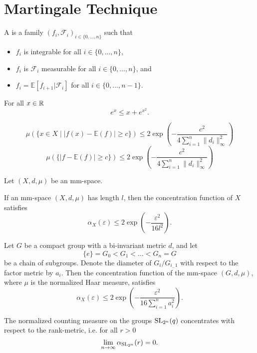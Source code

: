 \section{Martingale Technique}
\begin{definition}
A  is a family $(f_i,\mathcal{F}_i)_{i\in \{0,\dots,n\}}$ such that
\begin{itemize}
\item $f_i$ is integrable for all $i\in \{0,\dots,n\}$,
\item $f_i$ is $\mathcal{F}_i$ measurable for all $i\in \{0,\dots,n\}$, and
\item $f_i=\mathbb{E}[f_{i+1}|\mathcal{F}_i]$ for all $i\in \{0,\dots,n-1\}$.
\end{itemize}
\end{definition}

\begin{lemma} For all $x\in\mathbb{R}$
\[e^{x}\leq x+e^{x^2}.\]
\end{lemma}

\begin{lemma}
\[\mu(\{x\in X\mid |f(x)-\mathbb{E}(f)|\geq c\})\leq 2\exp\left(-\frac{c^2}{4\sum_{i=1}^{n}\|d_i\|^2_\infty}\right)\]
\[\mu(\{|f-\mathbb{E}(f)|\geq c\})\leq 2\exp\left(-\frac{c^2}{4\sum_{i=1}^{n}\|d_i\|^2_\infty}\right)\]
\end{lemma}

\begin{definition}\label{def:length}
Let $(X,d,\mu)$ be an mm-space.
\end{definition}

\begin{theorem}
If an mm-space $(X,d,\mu)$ has length $l$, then the concentration function of $X$ satisfies
\[\alpha_X(\varepsilon)\leq 2\exp\left(-\frac{\varepsilon^2}{16l^2}\right).\]
\end{theorem}


\begin{theorem}
Let $G$ be a compact group with a bi-invariant metric $d$, and let
\[\{e\}=G_0<G_1<\dots <G_n=G\]
be a chain of subgroups. Denote the diameter of $G_i/G_{i_-1}$ with respect to the factor metric by $a_i$. Then the concentration function of the mm-space $(G,d,\mu)$, where $\mu$ is the normalized Haar measure, satisfies
\[\alpha_X(\varepsilon)\leq 2\exp\left(-\frac{\varepsilon^2}{16\sum_{i=1}^{n}a_i^2}\right).\]
\end{theorem}

\begin{theorem}
The normalized counting measure on the groups $\operatorname{SL}_{2^n}(q)$ concentrates with respect to the rank-metric, i.e. for all $r>0$
\[\lim_{n\to\infty} \alpha_{\operatorname{SL}_{2^n}}(r)=0 .\]
\end{theorem}

